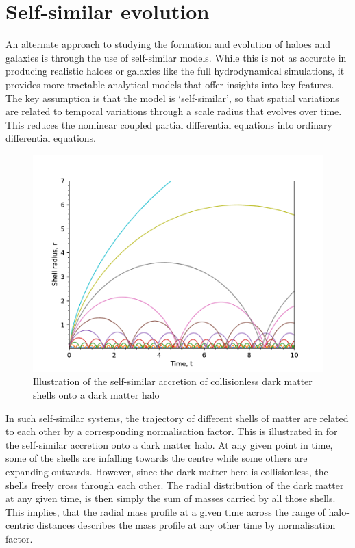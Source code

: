 \section{Self-similar evolution}
\label{sec:intro_self_sim}

An alternate approach to studying the formation and evolution of haloes and galaxies is through the use of self-similar models. While this is not as accurate in producing realistic haloes or galaxies like the full hydrodynamical simulations, it provides more tractable analytical models that offer insights into key features. The key assumption is that the model is `self-similar', so that spatial variations are related to temporal variations through a scale radius that evolves over time. This reduces the nonlinear coupled partial differential equations into ordinary differential equations.

\begin{figure}
\centering
\includegraphics[width=0.8\linewidth]{Figures/illustrate_self-sim_DM_shells.pdf}
\caption{Illustration of the self-similar accretion of collisionless dark matter shells onto a dark matter halo}
\label{fig:self_sim_illustrate}
\end{figure}

In such self-similar systems, the trajectory of different shells of matter are related to each other by a corresponding normalisation factor. This is illustrated in  for the self-similar accretion onto a dark matter halo. At any given point in time, some of the shells are infalling towards the centre while some others are expanding outwards. However, since the dark matter here is collisionless, the shells freely cross through each other. The radial distribution of the dark matter at any given time, is then simply the sum of masses carried by all those shells. This implies, that the radial mass profile at a given time across the range of halo-centric distances describes the mass profile at any other time by normalisation factor.

